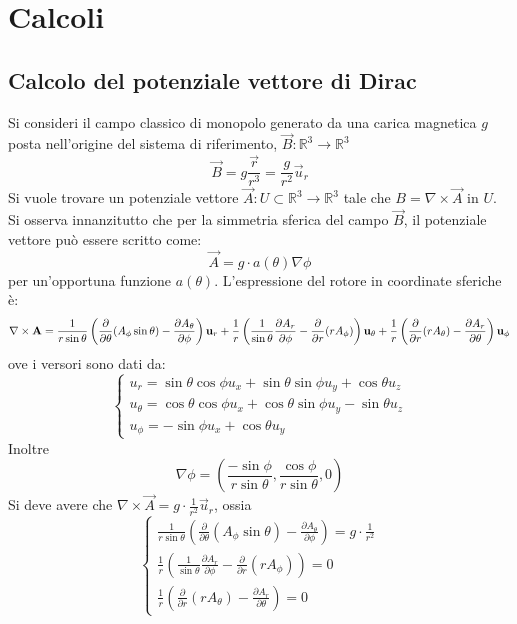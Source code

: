 \section{Calcoli}
\subsection{Calcolo del potenziale vettore di Dirac}
\label{sec:dirac_potential}
Si consideri il campo classico di monopolo generato da una carica magnetica $g$ posta
nell'origine del sistema di riferimento, $\vec B : \mathbb{R} ^3 \to \mathbb{R} ^3$
    $$ \vec B = g\frac{\vec r}{r^3} = \frac{g}{r^2} \vec u _r $$
Si vuole trovare un potenziale vettore $\vec A : U \subset \mathbb{R} ^3 \to \mathbb{R} ^3$ tale che
$ B = \nabla \times \vec A $ in $U$. Si osserva innanzitutto che per la simmetria
sferica del campo $\vec B$, il potenziale vettore può essere scritto come:
   $$ \vec A = g \cdot a(\theta) \nabla \phi $$
per un'opportuna funzione $a(\theta)$.
L'espressione del rotore in coordinate sferiche è:
$$
    \nabla \times \vec A =
         \frac{1}{r\sin\theta} \left(
              \frac{\partial}{\partial\theta}(A_\phi\sin\theta) -
              \frac{\partial A_\theta}{\partial\phi}
              \right) \vec u _r \\
         + \frac{1}{r} \left(
              \frac{1}{\sin\theta}\frac{\partial A_r}{\partial\phi} -
              \frac{\partial}{\partial r}(r A_\phi)
              \right)\vec u _\theta \\
         + \frac{1}{r} \left(
              \frac{\partial}{\partial r}(r A_\theta) - \frac{\partial A_r}{\partial\theta}
              \right)\vec u _\phi
$$
ove i versori sono dati da:
$$
\begin{cases}
    u_r = \sin\theta \cos\phi u_x + \sin\theta \sin\phi u_y + \cos\theta u_z\\
    u_\theta = \cos\theta \cos\phi u_x + \cos\theta \sin\phi u_y - \sin\theta u_z\\
    u_\phi = -\sin\phi u_x + \cos\theta u_y
\end{cases}
$$
Inoltre
$$
   \nabla \phi = \left( \frac{-\sin\phi}{r\sin\theta},\frac{\cos\phi}{r\sin\theta},0 \right)
$$
Si deve avere che $ \nabla \times \vec A = g \cdot \frac{1}{r^2} \vec u _r$,
ossia
$$
\begin{cases}
    \frac{1}{r\sin\theta} \left(
         \frac{\partial}{\partial\theta}(A_\phi\sin\theta) -
         \frac{\partial A_\theta}{\partial\phi}
         \right) = g \cdot \frac{1}{r^2} \\
    \frac{1}{r} \left(
         \frac{1}{\sin\theta}\frac{\partial A_r}{\partial\phi} -
         \frac{\partial}{\partial r}(r A_\phi)
         \right) = 0 \\
    \frac{1}{r} \left(
         \frac{\partial}{\partial r}(r A_\theta) - \frac{\partial A_r}{\partial\theta}
         \right) = 0
\end{cases}
$$
